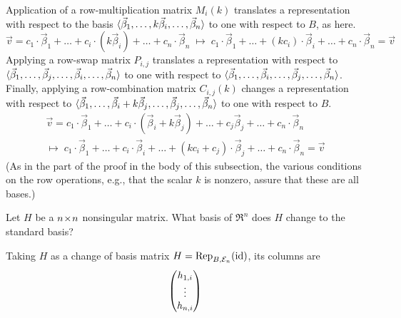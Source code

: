 \begin{exercises}
\begin{answer}
      Application of a row-multiplication matrix \( M_i(k) \) translates a
      representation with respect to the basis
      \( \langle\vec{\beta}_1,\dots,k\vec{\beta}_i,\dots,\vec{\beta}_n\rangle \)
      to one with respect to \( B \), as here.
      \begin{equation*}
         \vec{v}=c_1\cdot\vec{\beta}_1+\dots+c_i\cdot(k\vec{\beta}_i)
                   +\dots+c_n\cdot\vec{\beta}_n  
         \;\mapsto\;                                                       
         c_1\cdot\vec{\beta}_1+\dots
             +(kc_i)\cdot\vec{\beta}_i+\dots+c_n\cdot\vec{\beta}_n=\vec{v}
      \end{equation*}
      Applying a row-swap matrix \( P_{i,j} \) translates a representation
      with respect to
      \( \langle\vec{\beta}_1,\dots,\vec{\beta}_j,\dots,
        \vec{\beta}_i,\dots,\vec{\beta}_n\rangle \)
      to one with respect to
            \( \langle\vec{\beta}_1,\dots,\vec{\beta}_i,\dots,
        \vec{\beta}_j,\dots,\vec{\beta}_n\rangle \).
      Finally, applying a row-combination matrix \( C_{i,j}(k) \) changes a
      representation with respect to
      \( \langle\vec{\beta}_1,\dots,\vec{\beta}_i+k\vec{\beta}_j,\dots,
        \vec{\beta}_j,\dots,\vec{\beta}_n\rangle \)
      to one with respect to \( B \).  
      \begin{multline*}
         \vec{v}= c_1\cdot\vec{\beta}_1+\dots
                     +c_i\cdot(\vec{\beta}_i+k\vec{\beta}_j)
                       +\dots+c_j\vec{\beta}_j+\dots+c_n\cdot\vec{\beta}_n  
         \\  \mapsto\;                                                       
         c_1\cdot\vec{\beta}_1+\dots+c_i\cdot\vec{\beta}_i
               +\dots+(kc_i+c_j)\cdot\vec{\beta}_j
               +\dots+c_n\cdot\vec{\beta}_n=\vec{v}     
      \end{multline*}
      (As in the part of the proof in the body of this subsection, 
      the various conditions on the
      row operations, e.g., that the scalar $k$ is nonzero, assure that these
      are all bases.)
    \end{answer}
  \recommended \item 
    Let \( H \) be a \( n \! \times \! n \) nonsingular matrix.
    What basis of \( \Re^n \) does \( H \) change to the standard basis?
    \begin{answer}
       Taking $H$ as a change of basis matrix 
       $H={\rm Rep}_{B,{\cal E}_n}(\mbox{id})$, 
       its columns are
       \begin{equation*}
         \colvec{h_{1,i} \\ \vdots \\ h_{n,i}}

\end{equation*}
\end{answer}
\end{exercises}
